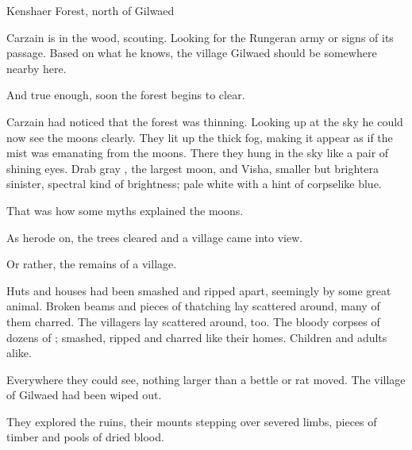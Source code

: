 
\stamp
  {\dateSortieFindsTown}
  {Kenshaer Forest, north of Gilwaed}

\begin{comment}
\section{Gilwaed in ruins}
\end{comment}

Carzain is in the wood, scouting. 
Looking for the Rungeran army or signs of its passage. 
Based on what he knows, the village Gilwaed should be somewhere nearby here.

And true enough, soon the forest begins to clear. 

Carzain had noticed that the forest was thinning. 
Looking up at the sky he could now see the moons clearly. 
They lit up the thick fog, making it appear as if the mist was emanating from the moons. 
There they hung in the sky like a pair of shining eyes. 
Drab gray \Dun, the largest moon, and Visha, smaller but brighter\dash a sinister, spectral kind of brightness; pale white with a hint of corpselike blue. 

That was how some myths explained the moons. 

As herode on, the trees cleared and a village came into view. 

Or rather, the remains of a village. 

Huts and houses had been smashed and ripped apart, seemingly by some great animal. 
Broken beams and pieces of thatching lay scattered around, many of them charred. 
The villagers lay scattered around, too. 
The bloody corpses of dozens of \scathae{}; smashed, ripped and charred like their homes. 
Children and adults alike. 

Everywhere they could see, nothing larger than a bettle or rat moved. 
The village of Gilwaed had been wiped out. 



They explored the ruins, their mounts stepping over severed limbs, pieces of timber and pools of dried blood. 

